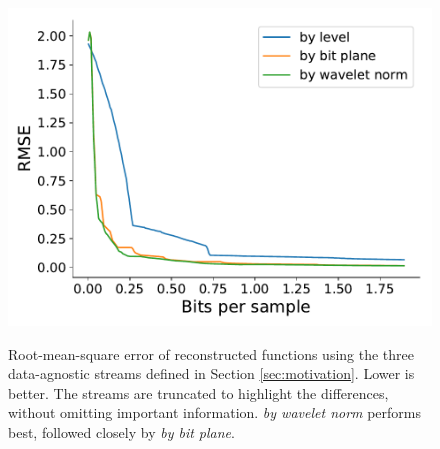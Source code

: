 \begin{figure}[h]
 	{\includegraphics[width=0.48\linewidth]{img/motivation/motivation-psnr-velocityz.pdf}}
 	\caption{Root-mean-square error of reconstructed functions using the three data-agnostic streams
 	defined in Section \ref{sec:motivation}. Lower is better. The streams are truncated to highlight
 	the differences, without omitting important information. \emph{by wavelet norm} performs best,
 	followed closely by \emph{by bit plane}.}
 	\label{fig:motivation-rmse}
\end{figure}

